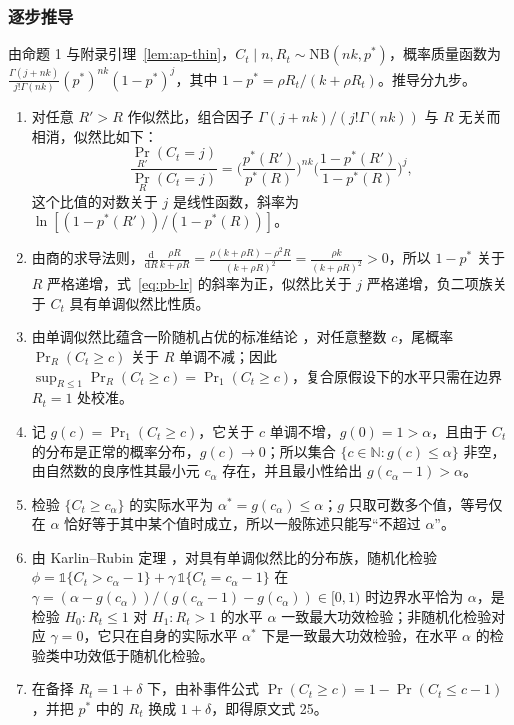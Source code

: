 \subsubsection{逐步推导}

由命题 1 与附录引理~\ref{lem:ap-thin}，$C_t\mid n,R_t\sim\mathrm{NB}(nk,p^*)$，概率质量函数为 $\frac{\Gamma(j+nk)}{j!\Gamma(nk)}(p^*)^{nk}(1-p^*)^j$，其中 $1-p^*=\rho R_t/(k+\rho R_t)$。推导分九步。
\begin{enumerate}
\item 对任意 $R'>R$ 作似然比，组合因子 $\Gamma(j+nk)/(j!\Gamma(nk))$ 与 $R$ 无关而相消，似然比如下：
\begin{equation}
\frac{\Pr_{R'}(C_t=j)}{\Pr_{R}(C_t=j)}=\Big(\frac{p^*(R')}{p^*(R)}\Big)^{nk}\Big(\frac{1-p^*(R')}{1-p^*(R)}\Big)^{j},\label{eq:pb-lr}
\end{equation}
这个比值的对数关于 $j$ 是线性函数，斜率为 $\ln[(1-p^*(R'))/(1-p^*(R))]$。
\item 由商的求导法则，$\frac{\mathrm d}{\mathrm dR}\frac{\rho R}{k+\rho R}=\frac{\rho(k+\rho R)-\rho^2R}{(k+\rho R)^2}=\frac{\rho k}{(k+\rho R)^2}>0$，所以 $1-p^*$ 关于 $R$ 严格递增，式~\eqref{eq:pb-lr} 的斜率为正，似然比关于 $j$ 严格递增，负二项族关于 $C_t$ 具有单调似然比性质。
\item 由单调似然比蕴含一阶随机占优的标准结论 \citep{lehmann2005testing}，对任意整数 $c$，尾概率 $\Pr_R(C_t\ge c)$ 关于 $R$ 单调不减；因此 $\sup_{R\le1}\Pr_R(C_t\ge c)=\Pr_{1}(C_t\ge c)$，复合原假设下的水平只需在边界 $R_t=1$ 处校准。
\item 记 $g(c)=\Pr_1(C_t\ge c)$，它关于 $c$ 单调不增，$g(0)=1>\alpha$，且由于 $C_t$ 的分布是正常的概率分布，$g(c)\to0$；所以集合 $\{c\in\mathbb N:g(c)\le\alpha\}$ 非空，由自然数的良序性其最小元 $c_\alpha$ 存在，并且最小性给出 $g(c_\alpha-1)>\alpha$。
\item 检验 $\{C_t\ge c_\alpha\}$ 的实际水平为 $\alpha^*=g(c_\alpha)\le\alpha$；$g$ 只取可数多个值，等号仅在 $\alpha$ 恰好等于其中某个值时成立，所以一般陈述只能写“不超过 $\alpha$”。
\item 由 Karlin–Rubin 定理 \citep{karlin1956theory,lehmann2005testing}，对具有单调似然比的分布族，随机化检验 $\phi=\mathbb 1\{C_t>c_\alpha-1\}+\gamma\,\mathbb 1\{C_t=c_\alpha-1\}$ 在 $\gamma=(\alpha-g(c_\alpha))/(g(c_\alpha-1)-g(c_\alpha))\in[0,1)$ 时边界水平恰为 $\alpha$，是检验 $H_0:R_t\le1$ 对 $H_1:R_t>1$ 的水平 $\alpha$ 一致最大功效检验；非随机化检验对应 $\gamma=0$，它只在自身的实际水平 $\alpha^*$ 下是一致最大功效检验，在水平 $\alpha$ 的检验类中功效低于随机化检验。
\item 在备择 $R_t=1+\delta$ 下，由补事件公式 $\Pr(C_t\ge c)=1-\Pr(C_t\le c-1)$，并把 $p^*$ 中的 $R_t$ 换成 $1+\delta$，即得原文式 25。

\end{enumerate}
